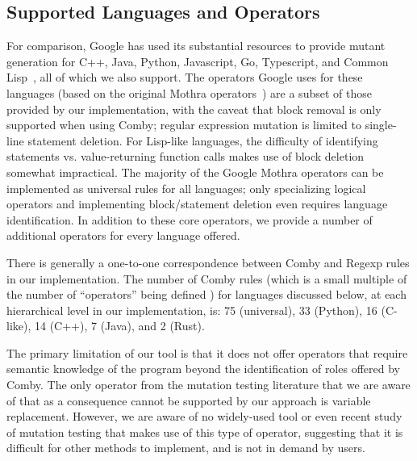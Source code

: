 \documentclass[acmsmall]{acmart}
\begin{document}
{%

\subsection{Supported Languages and Operators}

For comparison, Google has used its substantial resources to provide mutant generation for C++, Java,
Python, Javascript, Go, Typescript, and Common
Lisp~\cite{PetrovicMutationGoogle}, all of which we also support.  The
operators Google uses for these
languages (based on the original Mothra operators~\cite{offutt1996experimental}) are a subset of those provided by our implementation, with the caveat
that block removal is only supported when using Comby;
regular expression mutation is limited to single-line statement
deletion.  For Lisp-like languages, the difficulty of identifying statements vs. value-returning
function calls makes use of block deletion somewhat impractical.  The majority of the Google Mothra operators
can be implemented as universal rules for all languages; only specializing
logical operators and implementing block/statement deletion even requires
language identification.  In addition to these core operators, we
provide a number of additional operators for every language offered.

There is generally a one-to-one
correspondence between Comby and Regexp rules in our implementation.
The number of Comby rules (which is a small multiple of the number of
``operators'' being defined ) for languages discussed below, at each hierarchical level in our
implementation, is:  75 (universal), 33 (Python), 16 (C-like), 14
(C++), 7 (Java), and 2 (Rust).

The primary limitation of our tool is that it does not offer operators
that require semantic knowledge of the program beyond the
identification of roles offered by Comby.
The only operator from the mutation testing literature that we are aware of that
as a consequence cannot be supported by our approach is variable
replacement.  However, we are aware of no widely-used tool or even recent
study of mutation testing that makes use of this type of operator,
suggesting that it is difficult for other methods to implement, and is
not in demand by users.

}
\end{document}
